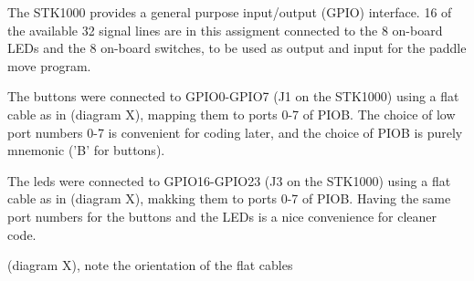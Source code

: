 The STK1000 provides a general purpose input/output (GPIO) interface.
16 of the available 32 signal lines are in this assigment connected to the 8 on-board LEDs and the 8 on-board switches, to be used as output and input for the paddle move program.

The buttons were connected to GPIO0-GPIO7 (J1 on the STK1000) using a flat cable as in (diagram X), mapping them to ports 0-7 of PIOB.
The choice of low port numbers 0-7 is convenient for coding later, and the choice of PIOB is purely mnemonic ('B' for buttons).

The leds were connected to GPIO16-GPIO23 (J3 on the STK1000) using a flat cable as in (diagram X), makking them to ports 0-7 of PIOB.
Having the same port numbers for the buttons and the LEDs is a nice convenience for cleaner code.


(diagram X), note the orientation of the flat cables
